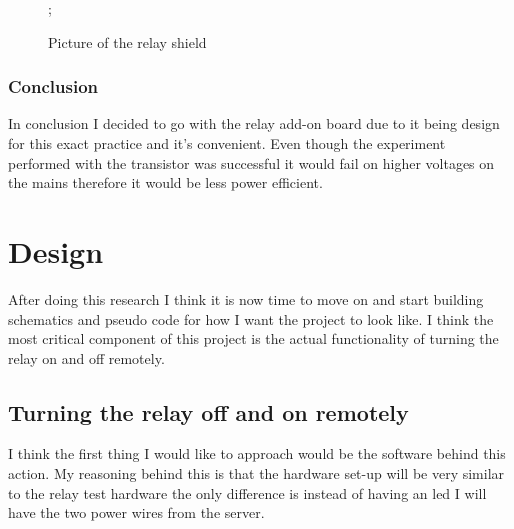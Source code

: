 \documentclass{article}
\begin{document}
\begin{figure}[H]
    \noindent{};
    \caption{Picture of the relay shield} \label{fig:relayShield}
\end{figure}

\subsubsection{Conclusion}
In conclusion I decided to go with the relay add-on board due to it being design for this exact practice and
it's convenient. Even though the experiment performed with the transistor was successful it would fail on
higher voltages on the mains therefore it would be less power efficient.

\section{Design}

After doing this research I think it is now time to move on and start building schematics and pseudo code
for how I want the project to look like. I think the most critical component of this project is the
actual functionality of turning the relay on and off remotely.

\subsection{Turning the relay off and on remotely}
I think the first thing I would like to approach would be the software behind this action. My reasoning
behind this is that the hardware set-up will be very similar to the relay test hardware the only difference
is instead of having an led I will have the two power wires from the server.
\end{document}
